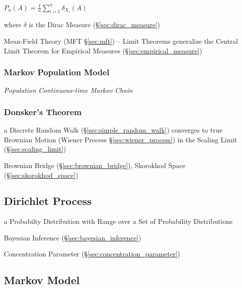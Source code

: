 $P_n(A) = \frac{1}{n}\sum_{i=1}^n \delta_{X_i}(A)$

where $\delta$ is the Dirac Measure (\S\ref{sec:dirac_measure})

\fist Mean-Field Theory (MFT \S\ref{sec:mft}) -- Limit Theorems generalize the
Central Limit Theorem for Empirical Measures (\S\ref{sec:empirical_measure})



\subsubsection{Markov Population Model}\label{sec:markov_population}

\emph{Population Continuous-time Markov Chain}



\subsubsection{Donsker's Theorem}\label{sec:donskers_theorem}

a Discrete Random Walk (\S\ref{sec:simple_random_walk}) converges to true
Brownian Motion (Wiener Process \S\ref{sec:wiener_process}) in the Scaling Limit
(\S\ref{sec:scaling_limit})

\fist Brownian Bridge (\S\ref{sec:brownian_bridge}), Skorokhod Space
(\S\ref{sec:skorokhod_space})



\subsection{Dirichlet Process}\label{sec:dirichlet_process}

a Probabilty Distribution with Range over a Set of Probability Distributions

Bayesian Inference (\S\ref{sec:bayesian_inference})

Concentration Parameter (\S\ref{sec:concentration_parameter})



\subsection{Markov Model}\label{sec:markov_model}

